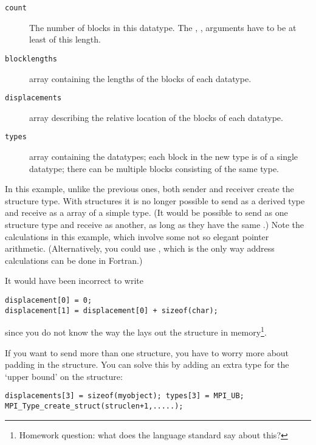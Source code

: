 \begin{description}
\item[\texttt{count}] The number of blocks in this
  datatype. The , , 
  arguments have to be at least of this length.
\item[\texttt{blocklengths}] array containing the lengths of the blocks of each datatype.
\item[\texttt{displacements}] array describing the relative location
  of the blocks of each datatype.
\item[\texttt{types}] array containing the datatypes; each block in
  the new type is of a single datatype; there can be multiple
  blocks consisting of the same type.
\end{description}
In this example, unlike the previous ones, both sender and receiver
create the structure type. With structures it is no longer possible to
send as a derived type and receive as a array of a simple type.
(It would be possible to send as one structure type and receive as another, 
as long as they have the same .)
%
%
Note the  calculations in this example,
which involve some not so elegant pointer arithmetic.
(Alternatively, you could use , which is
the only way address calculations can be done in Fortran.)

It would have been incorrect to write
\begin{lstlisting}
displacement[0] = 0;
displacement[1] = displacement[0] + sizeof(char);
\end{lstlisting}
since you do not know the way the  lays out the
structure in memory\footnote{Homework question: what does the language
  standard say about this?}.

If you want to send more than one structure, you have to worry more
about padding in the structure. You can solve this by adding an extra
type  for the `upper bound' on the structure:
\begin{lstlisting}
displacements[3] = sizeof(myobject); types[3] = MPI_UB;
MPI_Type_create_struct(struclen+1,.....);
\end{lstlisting}

